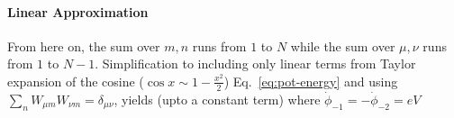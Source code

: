 \documentclass[%
reprint,
superscriptaddress,
 amsmath,amssymb,
 aps,
 prx,
longbibliography,
floatfix,
]{revtex4-2}
\begin{document}
\paragraph{Linear Approximation}
From here on, the sum over $m,n$ runs from $1$ to $N$ while the sum over $\mu,\nu$ runs from $1$ to $N-1$. Simplification to including only linear terms from Taylor expansion of the cosine ($\cos{x}\sim 1-\frac{x^2}{2}$) Eq.~\ref{eq:pot-energy} and using $\sum_{n}W_{\mu m}W_{\nu m}=\delta_{\mu\nu}$, yields (upto a constant term)
where $\dot{\phi}_{-1}=-\dot{\phi}_{-2}=eV$
\end{document}
